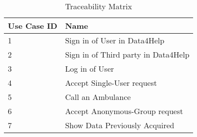       \begin{table}[h!]
        \centering
        \begin{tabularx}{\linewidth}{|X|X|}
          \hline

          \textbf{Use Case ID} & \textbf{Name}  \\
        	\hline

        	1 & Sign in of User in Data4Help\\
        	\hline

	2 & Sign in of Third party in Data4Help\\
        	\hline

        	3 & Log in of User\\
        	\hline

        	4 & Accept Single-User request\\
        	\hline

        	5 & Call an Ambulance\\
        	\hline

        	6 & Accept Anonymous-Group request\\
        	\hline

        	7 & Show Data Previously Acquired\\
          \hline

  	  
  \end{tabularx}
     
   \caption{Traceability Matrix}
   
   \end{table}



